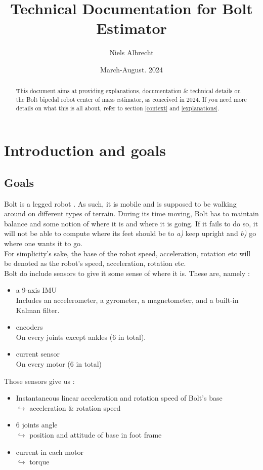 \documentclass[a4paper,10pt]{article}
\title{Technical Documentation for Bolt Estimator}
\date{March-August. 2024}
\author{Niels Albrecht}
\begin{document}
\maketitle

\begin{abstract}
This document aims at providing explanations, documentation \& technical details on the Bolt bipedal robot center of mass estimator, as conceived in 2024. If you need more details on what this is all about, refer to section \ref{context} and \ref{explanations}.

\end{abstract}

\newpage
\tableofcontents
\newpage

\section{Introduction and goals}
\subsection{Goals}
Bolt is a legged robot \cite{2} \cite{5}. As such, it is mobile and is supposed to be walking around on different types of terrain. During its time moving, Bolt has to maintain balance and some notion of where it is and where it is going. If it fails to do so, it will not be able to compute where its feet should be to \textit{a)} keep upright and \textit{b)} go where one wants it to go.\\
For simplicity's sake, the base of the robot speed, acceleration, rotation etc will be denoted as the robot's speed, acceleration, rotation etc.\\
Bolt do include sensors to give it some sense of where it is. These are, namely :

\begin{itemize}
	\item{a 9-axis IMU \cite{11}}\\
	Includes an accelerometer, a gyrometer, a magnetometer, and a built-in Kalman filter.
	\item{encoders}\\
	On every joints except ankles (6 in total).
	\item{current sensor}\\
	On every motor (6 in total)
\end{itemize}
\medskip
Those sensors give us :
\begin{itemize}
	\item{Instantaneous linear acceleration and rotation speed of Bolt's base\\
	$\hookrightarrow$ acceleration \& rotation speed}
	\item{6 joints angle\\
	$\hookrightarrow$ position and attitude of base in foot frame}
	\item{current in each motor\\
	$\hookrightarrow$ torque}
\end{itemize}
\end{document}
